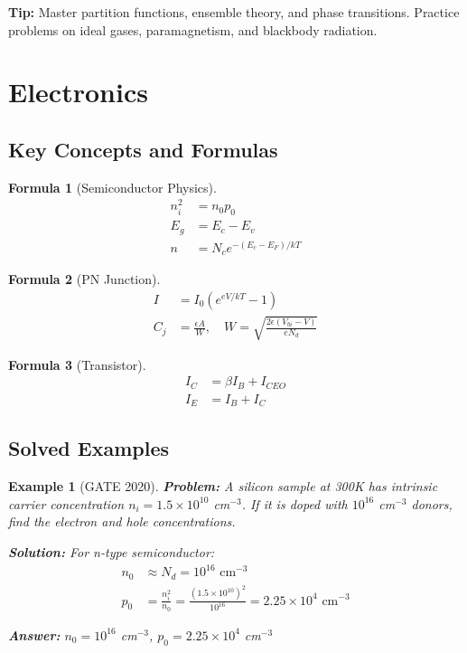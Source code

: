 \documentclass[12pt,a4paper]{article}
\newtheorem{example}{Example}[section]
\newtheorem{formula}{Formula}[section]
\newcommand{\ans}[1]{\textcolor{red!70!black}{\textbf{Answer:} #1}}
\newcommand{\sol}{\textcolor{blue!70!black}{\textbf{Solution:}}}
\newcommand{\tip}[1]{\textcolor{green!60!black}{\textbf{Tip:} #1}}
\begin{document}
\tip{Master partition functions, ensemble theory, and phase transitions. Practice problems on ideal gases, paramagnetism, and blackbody radiation.}

\section{Electronics}

\subsection{Key Concepts and Formulas}

\begin{formula}[Semiconductor Physics]
\begin{align}
n_i^2 &= n_0 p_0\\
E_g &= E_c - E_v\\
n &= N_c e^{-(E_c - E_F)/kT}
\end{align}
\end{formula}

\begin{formula}[PN Junction]
\begin{align}
I &= I_0(e^{eV/kT} - 1)\\
C_j &= \frac{\epsilon A}{W}, \quad W = \sqrt{\frac{2\epsilon(V_{bi} - V)}{eN_d}}
\end{align}
\end{formula}

\begin{formula}[Transistor]
\begin{align}
I_C &= \beta I_B + I_{CEO}\\
I_E &= I_B + I_C
\end{align}
\end{formula}

\subsection{Solved Examples}

\begin{example}[GATE 2020]
\textbf{Problem:} A silicon sample at 300K has intrinsic carrier concentration $n_i = 1.5 \times 10^{10}$ cm$^{-3}$. If it is doped with $10^{16}$ cm$^{-3}$ donors, find the electron and hole concentrations.

\sol
For n-type semiconductor:
\begin{align}
n_0 &\approx N_d = 10^{16} \text{ cm}^{-3}\\
p_0 &= \frac{n_i^2}{n_0} = \frac{(1.5 \times 10^{10})^2}{10^{16}} = 2.25 \times 10^4 \text{ cm}^{-3}
\end{align}

\ans{$n_0 = 10^{16}$ cm$^{-3}$, $p_0 = 2.25 \times 10^4$ cm$^{-3}$}
\end{example}
\end{document}
